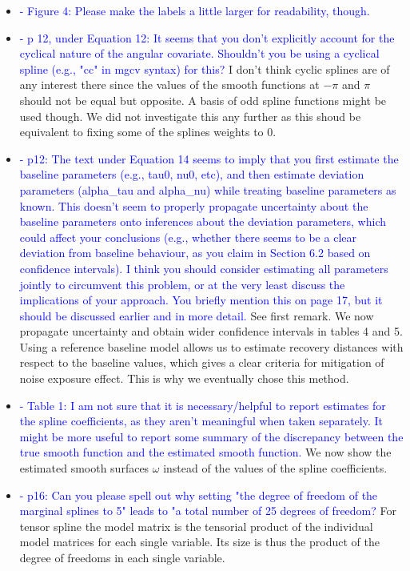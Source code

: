 \documentclass{amsart}
\theoremstyle{plain}
\theoremstyle{remark}
\newcommand {\1}{\mathbb{1}}
\begin{document}
\begin{itemize}
\item \textcolor{blue}{- Figure 4: Please make the labels a little larger for readability, though.}

\item \textcolor{blue}{- p 12, under Equation 12: It seems that you don't explicitly account for the cyclical nature of the angular covariate. Shouldn't you be using a cyclical spline (e.g., "cc" in mgcv syntax) for this?} I don't think cyclic splines are of any interest there since the values of the smooth functions at $-\pi$ and $\pi$ should not be equal but opposite. A basis of odd spline functions might be used though. We did not investigate this any further as this shoud be equivalent to fixing some of the splines weights to $0$. 

\item \textcolor{blue} { - p12: The text under Equation 14 seems to imply that you first estimate the baseline parameters (e.g., tau0, nu0, etc), and then estimate deviation parameters (alpha_tau and alpha_nu) while treating baseline parameters as known. This doesn't seem to properly propagate uncertainty about the baseline parameters onto inferences about the deviation parameters, which could affect your conclusions (e.g., whether there seems to be a clear deviation from baseline behaviour, as you claim in Section 6.2 based on confidence intervals). I think you should consider estimating all parameters jointly to circumvent this problem, or at the very least discuss the implications of your approach. You briefly mention this on page 17, but it should be discussed earlier and in more detail. } See first remark. We now propagate uncertainty and obtain wider confidence intervals in tables 4 and 5. Using a reference baseline model allows us to estimate recovery distances with respect to the baseline values, which gives a clear criteria for mitigation of noise exposure effect. This is why we eventually chose this method.

\item \textcolor{blue}{- Table 1: I am not sure that it is necessary/helpful to report estimates for the spline coefficients, as they aren't meaningful when taken separately. It might be more useful to report some summary of the discrepancy between the true smooth function and the estimated smooth function.} We now show the estimated smooth surfaces $\omega$ instead of the values of the spline coefficients.

\item \textcolor{blue}{- p16: Can you please spell out why setting "the degree of freedom of the marginal splines to 5" leads to "a total number of 25 degrees of freedom?}
For tensor spline the model matrix is the tensorial product of the individual model matrices for each single variable. Its size is thus the product of the degree of freedoms in each single variable.


\end{itemize}
\end{document}
